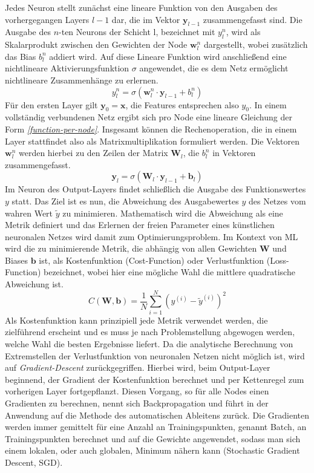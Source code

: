 Jedes Neuron stellt zunächst eine lineare Funktion von den Ausgaben des vorhergegangen Layers $l-1$ dar, die im Vektor $\mathbf{y}_{l-1}$ zusammengefasst sind. Die Ausgabe des $n$-ten Neurons der Schicht l, bezeichnet mit $y_l^n$, wird als Skalarprodukt zwischen den Gewichten der Node $\mathbf{w}_{l}^n$ dargestellt, wobei zusätzlich das Bias $b_l^n$ addiert wird. Auf diese Lineare Funktion wird anschließend eine nichtlineare Aktivierungsfunktion $\sigma$ angewendet, die es dem Netz ermöglicht nichtlineare Zusammenhänge zu erlernen.
\begin{equation}
y_l^n = \sigma\left(\mathbf{w}_{l}^n \cdot \mathbf{y}_{l-1} + b_{l}^n\right)
\label{function-per-node}
\end{equation}
Für den ersten Layer gilt  $\mathbf{y}_0 = \mathbf{x}$, die Features entsprechen also $y_0$. In einem vollständig verbundenen Netz ergibt sich pro Node eine lineare Gleichung der Form \textit{\autoref{function-per-node}}. Insgesamt können die Rechenoperation, die in einem Layer stattfindet also als Matrixmultiplikation formuliert werden. Die Vektoren $\mathbf{w}_{l}^n$ werden hierbei zu den Zeilen der Matrix $\mathbf{W}_l$, die  $b_{l}^n$ in Vektoren zusammengefasst.
\begin{equation}
\mathbf{y}_l = \sigma\left(\mathbf{W}_l\cdot \mathbf{y}_{l-1} + \mathbf{b}_l\right)
\end{equation}
Im Neuron des Output-Layers findet schließlich die Ausgabe des Funktionswertes $y$ statt. Das Ziel ist es nun, die Abweichung des Ausgabewertes $y$ des Netzes vom wahren Wert $\tilde{y}$ zu minimieren. Mathematisch wird die Abweichung als eine Metrik definiert und das Erlernen der freien Parameter eines künstlichen neuronalen Netzes wird damit zum Optimierungsproblem. Im Kontext von ML wird die zu minimierende Metrik, die abhängig von allen Gewichten $\mathbf{W}$ und Biases $\mathbf{b}$ ist, als Kostenfunktion (Cost-Function) oder Verlustfunktion (Loss-Function) bezeichnet, wobei hier eine mögliche Wahl die mittlere quadratische Abweichung ist.
\begin{equation}
C\left(\mathbf{W}, \mathbf{b}\right) = \frac{1}{N}\sum_{i=1}^{N}\left(y^{(i)} - \tilde{y}^{(i)}\right)^2
\end{equation}
Als Kostenfunktion kann prinzipiell jede Metrik verwendet werden, die zielführend erscheint und es muss je nach Problemstellung abgewogen werden, welche Wahl die besten Ergebnisse liefert.
Da die analytische Berechnung von Extremstellen der Verlustfunktion von neuronalen Netzen nicht möglich ist, wird auf \textit{Gradient-Descent} zurückgegriffen. Hierbei wird, beim Output-Layer beginnend, der Gradient der Kostenfunktion berechnet und per Kettenregel zum vorherigen Layer fortgepflanzt. Diesen Vorgang, so für alle Nodes einen Gradienten zu berechnen, nennt sich Backpropagation und führt in der Anwendung auf die Methode des automatischen Ableitens zurück. Die Gradienten werden immer gemittelt für eine Anzahl an Trainingspunkten, genannt Batch, an Trainingspunkten berechnet und auf die Gewichte angewendet, sodass man sich einem lokalen, oder auch globalen, Minimum nähern kann (Stochastic Gradient Descent, SGD).
